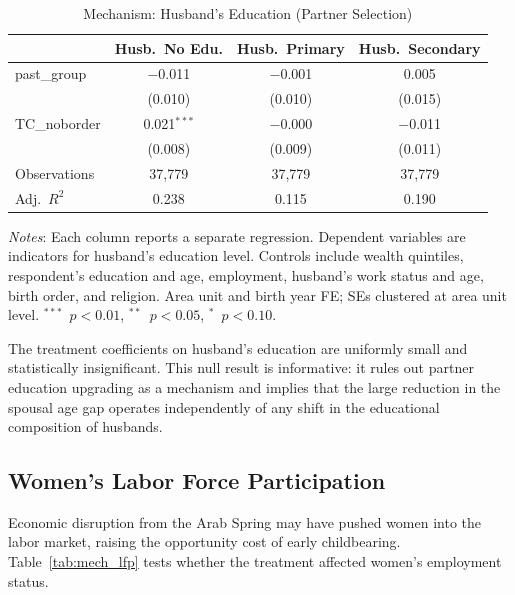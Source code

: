 \documentclass[12pt,a4paper]{article}
\begin{document}
\begin{table}[H]
\centering
\begin{threeparttable}
\caption{Mechanism: Husband's Education (Partner Selection)}
\label{tab:mech_husbedu}
\small
\begin{tabular}{@{}lccc@{}}
\toprule
 & Husb.\ No Edu. & Husb.\ Primary & Husb.\ Secondary \\
\midrule
past\_group  & $-$0.011 & $-$0.001 & 0.005 \\
             & (0.010) & (0.010) & (0.015) \\[3pt]
TC\_noborder & 0.021$^{***}$ & $-$0.000 & $-$0.011 \\
             & (0.008) & (0.009) & (0.011) \\[4pt]
\midrule
Observations & 37,779 & 37,779 & 37,779 \\
Adj.\ $R^2$  & 0.238 & 0.115 & 0.190 \\
\bottomrule
\end{tabular}
\begin{tablenotes}[flushleft]
\footnotesize
\item \textit{Notes}: Each column reports a separate regression. Dependent variables are indicators for husband's education level. Controls include wealth quintiles, respondent's education and age, employment, husband's work status and age, birth order, and religion. Area unit and birth year FE; SEs clustered at area unit level. $^{***}$~$p<0.01$, $^{**}$~$p<0.05$, $^{*}$~$p<0.10$.
\end{tablenotes}
\end{threeparttable}
\end{table}

\noindent The treatment coefficients on husband's education are uniformly small and statistically insignificant. This null result is informative: it rules out partner education upgrading as a mechanism and implies that the large reduction in the spousal age gap operates independently of any shift in the educational composition of husbands.
\vspace{0.25cm}

\subsection{Women's Labor Force Participation}

Economic disruption from the Arab Spring may have pushed women into the labor market, raising the opportunity cost of early childbearing. Table~\ref{tab:mech_lfp} tests whether the treatment affected women's employment status.
\vspace{0.25cm}
\end{document}
